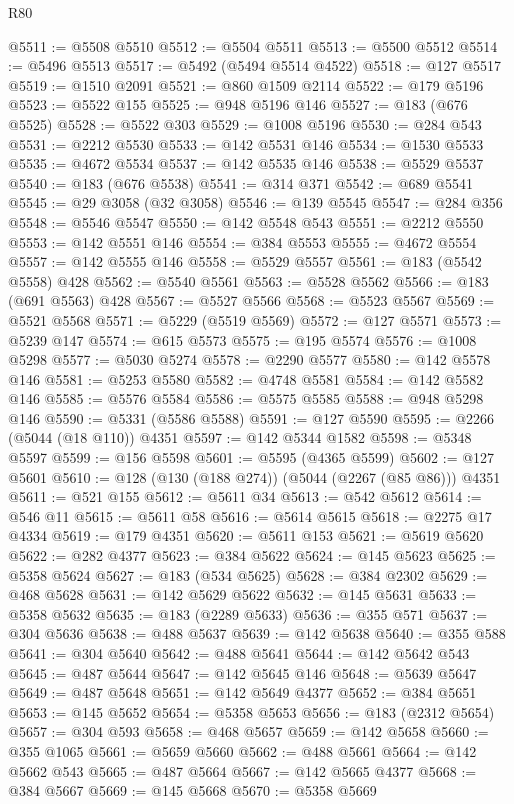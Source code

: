 \begin{lexlean}{R80}
\begin{coremodule}
@5511 := @5508 @5510
@5512 := @5504 @5511
@5513 := @5500 @5512
@5514 := @5496 @5513
@5517 := @5492 (@5494 @5514 @4522)
@5518 := @127 @5517
@5519 := @1510 @2091
@5521 := @860 @1509 @2114
@5522 := @179 @5196
@5523 := @5522 @155
@5525 := @948 @5196 @146
@5527 := @183 (@676 @5525)
@5528 := @5522 @303
@5529 := @1008 @5196
@5530 := @284 @543
@5531 := @2212 @5530
@5533 := @142 @5531 @146
@5534 := @1530 @5533
@5535 := @4672 @5534
@5537 := @142 @5535 @146
@5538 := @5529 @5537
@5540 := @183 (@676 @5538)
@5541 := @314 @371
@5542 := @689 @5541
@5545 := @29 @3058 (@32 @3058)
@5546 := @139 @5545
@5547 := @284 @356
@5548 := @5546 @5547
@5550 := @142 @5548 @543
@5551 := @2212 @5550
@5553 := @142 @5551 @146
@5554 := @384 @5553
@5555 := @4672 @5554
@5557 := @142 @5555 @146
@5558 := @5529 @5557
@5561 := @183 (@5542 @5558) @428
@5562 := @5540 @5561
@5563 := @5528 @5562
@5566 := @183 (@691 @5563) @428
@5567 := @5527 @5566
@5568 := @5523 @5567
@5569 := @5521 @5568
@5571 := @5229 (@5519 @5569)
@5572 := @127 @5571
@5573 := @5239 @147
@5574 := @615 @5573
@5575 := @195 @5574
@5576 := @1008 @5298
@5577 := @5030 @5274
@5578 := @2290 @5577
@5580 := @142 @5578 @146
@5581 := @5253 @5580
@5582 := @4748 @5581
@5584 := @142 @5582 @146
@5585 := @5576 @5584
@5586 := @5575 @5585
@5588 := @948 @5298 @146
@5590 := @5331 (@5586 @5588)
@5591 := @127 @5590
@5595 := @2266 (@5044 (@18 @110)) @4351
@5597 := @142 @5344 @1582
@5598 := @5348 @5597
@5599 := @156 @5598
@5601 := @5595 (@4365 @5599)
@5602 := @127 @5601
@5610 := @128 (@130 (@188 @274)) (@5044 (@2267 (@85 @86))) @4351
@5611 := @521 @155
@5612 := @5611 @34
@5613 := @542 @5612
@5614 := @546 @11
@5615 := @5611 @58
@5616 := @5614 @5615
@5618 := @2275 @17 @4334
@5619 := @179 @4351
@5620 := @5611 @153
@5621 := @5619 @5620
@5622 := @282 @4377
@5623 := @384 @5622
@5624 := @145 @5623
@5625 := @5358 @5624
@5627 := @183 (@534 @5625)
@5628 := @384 @2302
@5629 := @468 @5628
@5631 := @142 @5629 @5622
@5632 := @145 @5631
@5633 := @5358 @5632
@5635 := @183 (@2289 @5633)
@5636 := @355 @571
@5637 := @304 @5636
@5638 := @488 @5637
@5639 := @142 @5638
@5640 := @355 @588
@5641 := @304 @5640
@5642 := @488 @5641
@5644 := @142 @5642 @543
@5645 := @487 @5644
@5647 := @142 @5645 @146
@5648 := @5639 @5647
@5649 := @487 @5648
@5651 := @142 @5649 @4377
@5652 := @384 @5651
@5653 := @145 @5652
@5654 := @5358 @5653
@5656 := @183 (@2312 @5654)
@5657 := @304 @593
@5658 := @468 @5657
@5659 := @142 @5658
@5660 := @355 @1065
@5661 := @5659 @5660
@5662 := @488 @5661
@5664 := @142 @5662 @543
@5665 := @487 @5664
@5667 := @142 @5665 @4377
@5668 := @384 @5667
@5669 := @145 @5668
@5670 := @5358 @5669

\end{coremodule}
\end{lexlean}

